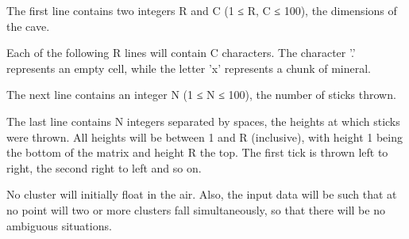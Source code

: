 The first line contains two integers R and C (1 ≤ R, C ≤ 100), the dimensions of the cave.  

   Each of the following R lines will contain C characters. The character '.' represents an empty cell, while the letter 'x' represents a chunk of mineral.  

   The next line contains an integer N (1 ≤ N ≤ 100), the number of sticks thrown.  

   The last line contains N integers separated by spaces, the heights at which sticks were thrown. All heights will be between 1 and R (inclusive), with height 1 being the bottom of the matrix and height R the top. The first tick is thrown left to right, the second right to left and so on.  

   No cluster will initially float in the air. Also, the input data will be such that at no point will two or more clusters fall simultaneously, so that there will be no ambiguous situations.